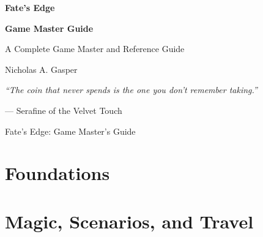 \documentclass[11pt]{book}
\begin{document}
\begin{titlepage}
\centering
\vspace*{1cm}

{\Huge\bfseries Fate's Edge\par}
\vspace{0.3cm}
{\Large\bfseries Game Master Guide\par}
\vspace{0.5cm}
{\large A Complete Game Master and Reference Guide\par}
\vspace{2cm}

{\large Nicholas A. Gasper\par}
\vspace{0.3cm}

\vspace{2cm}
{\large \textit{``The coin that never spends is the one you don't remember taking.''}\par}
\vspace{0.2cm}
{\large --- Serafine of the Velvet Touch\par}

\vfill
{\large Fate's Edge: Game Master's Guide\par}
\end{titlepage}



\part{Foundations}
\clearpage
\clearpage
\clearpage
\clearpage

\part{Magic, Scenarios, and Travel}
\clearpage
\clearpage
\clearpage
\clearpage
\clearpage
\end{document}

